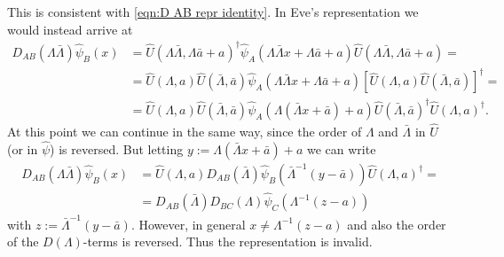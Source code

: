 \documentclass[english, parskip=full]{scrartcl}
\newcommand{\kla}{}
\newcommand{\klam}{}
\begin{document}
This is consistent with \autoref{eqn:D AB repr identity}.
In Eve's representation we would instead arrive at
\begin{align}
D_{AB}(\Lambda\bar{\Lambda}) \hat{\psi}_B(x) &= \hat{U}(\Lambda\bar{\Lambda}, \Lambda \bar{a} + a)^\dagger \hat{\psi}_A(\Lambda\bar{\Lambda} x + \Lambda\bar{a} + a) \hat{U}(\Lambda\bar{\Lambda}, \Lambda \bar{a} + a) = \\
&= \hat{U}(\Lambda, a) \hat{U}(\bar{\Lambda}, \bar{a}) \hat{\psi}_A(\Lambda\bar{\Lambda} x + \Lambda\bar{a} + a) \klam\left[ \hat{U}(\Lambda, a) \hat{U}(\bar{\Lambda}, \bar{a}) \right]^\dagger = \\
&= \hat{U}(\Lambda, a)  \hat{U}(\bar{\Lambda}, \bar{a}) \hat{\psi}_A\kla\left( \Lambda (\bar{\Lambda} x + \bar{a}) + a \right) \hat{U}(\bar{\Lambda}, \bar{a})^\dagger \hat{U}(\Lambda, a)^\dagger.
\end{align}
At this point we can continue in the same way, since the order of $\Lambda$ and $\bar{\Lambda}$ in $\hat{U}$ (or in $\hat{\psi}$) is reversed.
But letting $y := \Lambda (\bar{\Lambda} x + \bar{a}) + a$ we can write
\begin{align}
D_{AB}(\Lambda\bar{\Lambda}) \hat{\psi}_B(x) &= \hat{U}(\Lambda, a) D_{AB}(\bar{\Lambda}) \hat{\psi}_B \kla\left( \bar{\Lambda}^{-1} (y - \bar{a}) \right) \hat{U}(\Lambda, a)^\dagger = \\
&= D_{AB}(\bar{\Lambda}) D_{BC}(\Lambda) \hat{\psi}_C\kla\left( \Lambda^{-1} (z - a) \right)
\end{align}
with $z := \bar{\Lambda}^{-1} (y - \bar{a})$.
However, in general $x \neq \Lambda^{-1} (z - a)$ and also the order of the $D(\Lambda)$-terms is reversed. 
Thus the representation is invalid.
\end{document}
